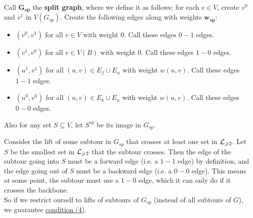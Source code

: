 \documentclass[./main.tex]{subfiles}
\begin{document}
			\vspace{2mm}\pagebreak[2]
			\begin{definition}
				Call $\bm{G_{sp}}$ the \textbf{split graph}, where we define it as follows: for each $v\in V$, create $v^0$ and $v^1$ in $V(G_{sp})$. Create the following edges along with weights $\bm{w_{sp}}$:
				\begin{itemize}[$-$]
					\item $(v^0, v^1)$ for all $v\in V$ with weight $0$. Call these edges $0-1$ edges.
					\item $(v^1, v^0)$ for all $v\in V(B)$ with weight $0$. Call these edges $1-0$ edges.
					\item $(u^1, v^1)$ for all $(u,v)\in E_f\cup E_n$ with weight $w(u,v)$. Call these edges $1-1$ edges.
					\item $(u^0, v^0)$ for all $(u,v)\in E_b\cup E_n$ with weight $w(u,v)$. Call these edges $0-0$ edges.
				\end{itemize}
				Also for any set $S\subseteq V$, let $S^{sp}$ be its image in $G_{sp}$.\\
			\end{definition}

			Consider the lift of some subtour in $G_{sp}$ that crosses at least one set in $\mathcal{L}_{\geqslant 2}$. Let $S$ be the smallest set in $\mathcal{L}_{\geqslant 2}$ that the subtour crosses.
			Then the edge of the subtour going into $S$ must be a forward edge (i.e. a $1-1$ edge) by definition, and the edge going out of $S$ must be a backward edge (i.e. a $0-0$ edge). This means at some point, the subtour must use a $1-0$ edge, which it can only do if it crosses the backbone.\\
			\vspace{1mm}
			So if we restrict ourself to lifts of subtours of $G_{sp}$ (instead of all subtours of $G$), we guarantee \hyperref[lemm:main:4]{condition (4)}.\vspace{2mm}
\end{document}
